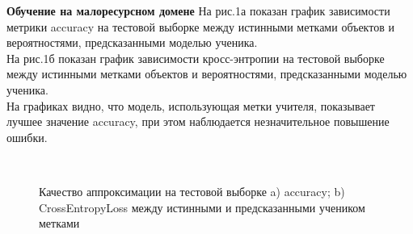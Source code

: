 \newpage
\textbf{Обучение на малоресурсном домене}
На рис.1а показан график зависимости метрики accuracy на тестовой выборке между истинными метками объектов и вероятностями, предсказанными моделью ученика.\\
На рис.1б показан график зависимости кросс-энтропии на тестовой выборке между истинными метками объектов и вероятностями, предсказанными моделью ученика.\\
На графиках видно, что модель, использующая метки учителя, показывает лучшее значение accuracy, при этом наблюдается незначительное повышение ошибки.
\begin{figure}[h!t]\center
{}
\\
\caption{Качество аппроксимации на тестовой выборке a) accuracy; b) CrossEntropyLoss между истинными и предсказанными учеником метками}
\end{figure}
